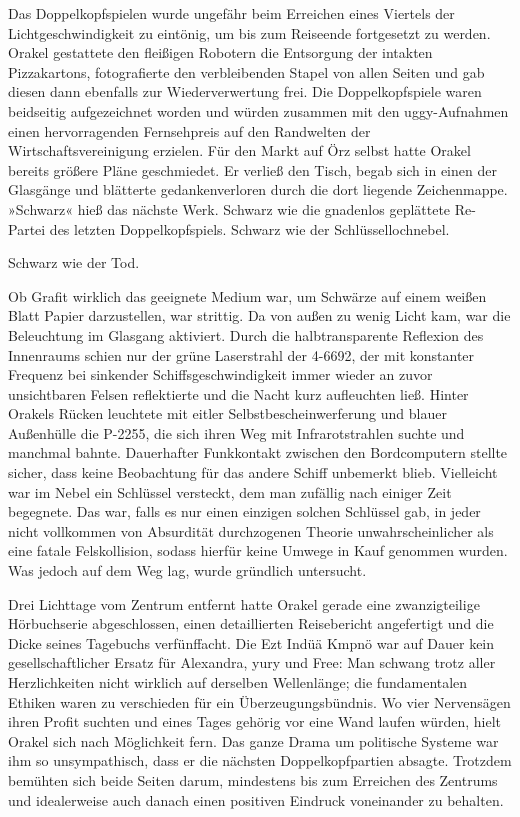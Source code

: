 Das Doppelkopfspielen wurde ungefähr beim Erreichen eines Viertels der Lichtgeschwindigkeit zu eintönig, um bis zum Reiseende fortgesetzt zu werden. Orakel gestattete den fleißigen Robotern die Entsorgung der intakten Pizzakartons, fotografierte den verbleibenden Stapel von allen Seiten und gab diesen dann ebenfalls zur Wiederverwertung frei. Die Doppelkopfspiele waren beidseitig aufgezeichnet worden und würden zusammen mit den uggy-Aufnahmen einen hervorragenden Fernsehpreis auf den Randwelten der Wirtschaftsvereinigung erzielen. Für den Markt auf Örz selbst hatte Orakel bereits größere Pläne geschmiedet. Er verließ den Tisch, begab sich in einen der Glasgänge und blätterte gedankenverloren durch die dort liegende Zeichenmappe. »Schwarz« hieß das nächste Werk. Schwarz wie die gnadenlos geplättete Re-Partei des letzten Doppelkopfspiels. Schwarz wie der Schlüssellochnebel.

Schwarz wie der Tod.

Ob Grafit wirklich das geeignete Medium war, um Schwärze auf einem weißen Blatt Papier darzustellen, war strittig. Da von außen zu wenig Licht kam, war die Beleuchtung im Glasgang aktiviert. Durch die halbtransparente Reflexion des Innenraums schien nur der grüne Laserstrahl der 4-6692, der mit konstanter Frequenz bei sinkender Schiffsgeschwindigkeit immer wieder an zuvor unsichtbaren Felsen reflektierte und die Nacht kurz aufleuchten ließ. Hinter Orakels Rücken leuchtete mit eitler Selbstbescheinwerferung und blauer Außenhülle die P-2255, die sich ihren Weg mit Infrarotstrahlen suchte und manchmal bahnte. Dauerhafter Funkkontakt zwischen den Bordcomputern stellte sicher, dass keine Beobachtung für das andere Schiff unbemerkt blieb. Vielleicht war im Nebel ein Schlüssel versteckt, dem man zufällig nach einiger Zeit begegnete. Das war, falls es nur einen einzigen solchen Schlüssel gab, in jeder nicht vollkommen von Absurdität durchzogenen Theorie unwahrscheinlicher als eine fatale Felskollision, sodass hierfür keine Umwege in Kauf genommen wurden. Was jedoch auf dem Weg lag, wurde gründlich untersucht.

Drei Lichttage vom Zentrum entfernt hatte Orakel gerade eine zwanzigteilige Hörbuchserie abgeschlossen, einen detaillierten Reisebericht angefertigt und die Dicke seines Tagebuchs verfünffacht. Die Ezt Indüä Kmpnö war auf Dauer kein gesellschaftlicher Ersatz für Alexandra, yury und Free: Man schwang trotz aller Herzlichkeiten nicht wirklich auf derselben Wellenlänge; die fundamentalen Ethiken waren zu verschieden für ein Überzeugungsbündnis. Wo vier Nervensägen ihren Profit suchten und eines Tages gehörig vor eine Wand laufen würden, hielt Orakel sich nach Möglichkeit fern. Das ganze Drama um politische Systeme war ihm so unsympathisch, dass er die nächsten Doppelkopfpartien absagte. Trotzdem bemühten sich beide Seiten darum, mindestens bis zum Erreichen des Zentrums und idealerweise auch danach einen positiven Eindruck voneinander zu behalten.

